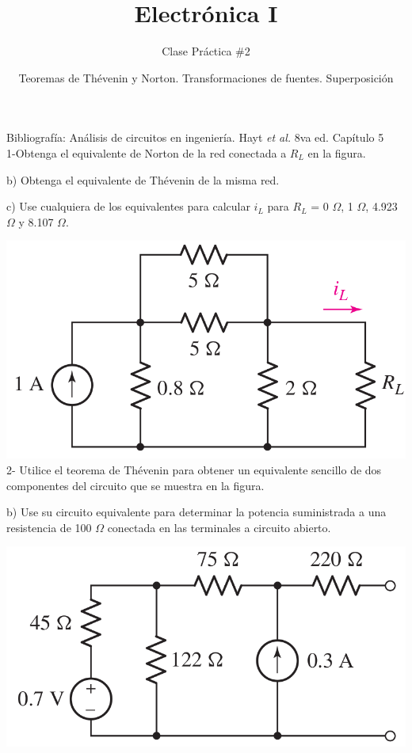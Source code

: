\documentclass[10pt,letterpaper]{article}
\author{Clase Práctica $\#$2}
\title{Electrónica I}
\date{Teoremas de Thévenin y Norton. Transformaciones de fuentes. Superposición}
\begin{document}
	\maketitle
	
Bibliografía: Análisis de circuitos en ingeniería. Hayt \textit{et al.} 8va ed. Capítulo 5
\\

1-Obtenga el equivalente de Norton de la red conectada a $R_L$ en la figura.
 
 b) Obtenga el equivalente de Thévenin de la misma red. 
 
 c) Use cualquiera de los equivalentes para calcular $i_L$ para $R_L$ = 0 $\Omega$, 1 $\Omega$, 4.923 $\Omega$ y 8.107 $\Omega$.
 
 \includegraphics[scale=.3]{c1}
 \\
 
 2- Utilice el teorema de Thévenin para obtener un equivalente sencillo de dos componentes del circuito que se muestra en la figura.
 
 b) Use su circuito equivalente para determinar la potencia suministrada a una resistencia de 100 $\Omega$ conectada en las terminales a circuito abierto.
 
 \includegraphics[scale=0.3]{c2}
 \\
\end{document}
